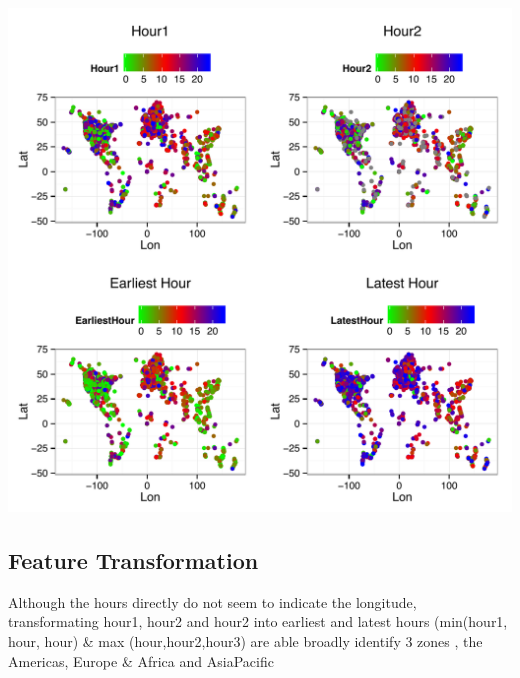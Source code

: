 \begin{center}
\includegraphics[width=0.75\columnwidth]{figures/featurePlot.pdf} %
\label{fig:featureHour}
\end{center}

\subsection{Feature Transformation}
Although the hours directly do not seem to indicate the longitude, transformating hour1, hour2 and hour2 into earliest and latest hours (min(hour1, hour, hour) \& max (hour,hour2,hour3) are able broadly identify 3 zones , the Americas, Europe \& Africa and AsiaPacific

